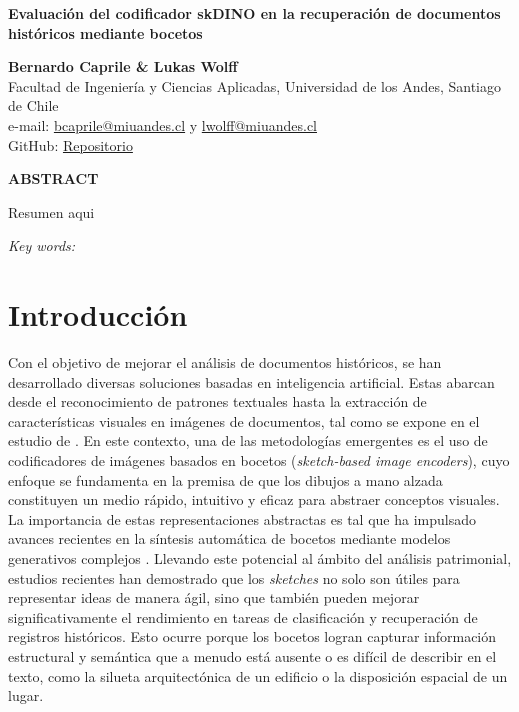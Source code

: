 \documentclass[11pt]{article}
\begin{document}
    \begin{center}
        
    \vspace*{1cm}


    \textbf{\Large Evaluación del codificador skDINO en la recuperación de documentos históricos mediante bocetos}
  
    \vspace{1cm}
    
    \textbf{Bernardo Caprile \& Lukas Wolff}\\
    Facultad de Ingeniería y Ciencias Aplicadas, Universidad de los Andes, Santiago de Chile\\
    e-mail: \href{mailto:bcaprile@miuandes.cl}{bcaprile@miuandes.cl} y \href{mailto:lwolff@miuandes.cl}{lwolff@miuandes.cl}\\
    GitHub: \href{https://github.com/LukasWolff2002/TAREA_1_RECON_VISUAL/tree/master}{Repositorio}
    \vspace{1cm}
    
    \textbf{ABSTRACT}
    \end{center}
    \vspace{0.5cm}
    
    Resumen aqui


    \vspace{0.5cm}
    
    \textit{Key words:} \textit{}

\section{Introducción}

Con el objetivo de mejorar el análisis de documentos históricos, se han desarrollado diversas soluciones basadas en inteligencia artificial. Estas abarcan desde el reconocimiento de patrones textuales hasta la extracción de características visuales en imágenes de documentos, tal como se expone en el estudio de \cite{saavedra2025leveraging}. En este contexto, una de las metodologías emergentes es el uso de codificadores de imágenes basados en bocetos (\textit{sketch-based image encoders}), cuyo enfoque se fundamenta en la premisa de que los dibujos a mano alzada constituyen un medio rápido, intuitivo y eficaz para abstraer conceptos visuales. La importancia de estas representaciones abstractas es tal que ha impulsado avances recientes en la síntesis automática de bocetos mediante modelos generativos complejos \cite{wu2025one}. Llevando este potencial al ámbito del análisis patrimonial, estudios recientes \cite{torres2021compact, wang2024sketchy} han demostrado que los \textit{sketches} no solo son útiles para representar ideas de manera ágil, sino que también pueden mejorar significativamente el rendimiento en tareas de clasificación y recuperación de registros históricos. Esto ocurre porque los bocetos logran capturar información estructural y semántica que a menudo está ausente o es difícil de describir en el texto, como la silueta arquitectónica de un edificio o la disposición espacial de un lugar.
\end{document}

